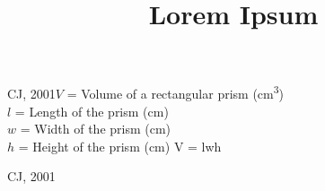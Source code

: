 \documentclass{vb}
\title{Lorem Ipsum}
\begin{document}
\thispagestyle{empty}
\maketitle
\begin{abstract}
  \lipsum[1]
\end{abstract}
\begin{multicols}{2}
  \lipsum[1-3]
  \begin{vb_equation}{CJ, 2001}{$V$ = Volume of a rectangular prism (\si{\centi\meter^3}) \\
      \indent $l$ = Length of the prism (\si{\centi\meter}) \\
      \indent $w$ = Width of the prism (\si{\centi\meter}) \\
      \indent $h$ = Height of the prism (\si{\centi\meter})}
    V = lwh
  \end{vb_equation}{CJ, 2001}
  \lipsum[4-5]
\end{multicols}
\end{document}
